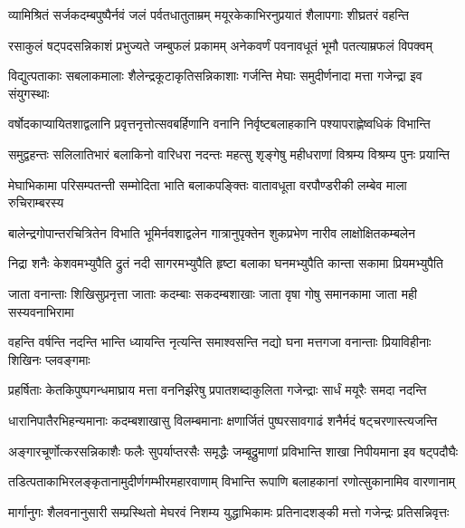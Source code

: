 \twolineshloka
{व्यामिश्रितं सर्जकदम्बपुष्पैर्नवं जलं पर्वतधातुताम्रम्}
{मयूरकेकाभिरनुप्रयातं शैलापगाः शीघ्रतरं वहन्ति} %

\twolineshloka
{रसाकुलं षट्पदसन्निकाशं प्रभुज्यते जम्बुफलं प्रकामम्}
{अनेकवर्णं पवनावधूतं भूमौ पतत्याम्रफलं विपक्वम्} %

\twolineshloka
{विद्युत्पताकाः सबलाकमालाः शैलेन्द्रकूटाकृतिसन्निकाशाः}
{गर्जन्ति मेघाः समुदीर्णनादा मत्ता गजेन्द्रा इव संयुगस्थाः} %

\twolineshloka
{वर्षोदकाप्यायितशाद्वलानि प्रवृत्तनृत्तोत्सवबर्हिणानि}
{वनानि निर्वृष्टबलाहकानि पश्यापराह्णेष्वधिकं विभान्ति} %

\twolineshloka
{समुद्वहन्तः सलिलातिभारं बलाकिनो वारिधरा नदन्तः}
{महत्सु शृङ्गेषु महीधराणां विश्रम्य विश्रम्य पुनः प्रयान्ति} %

\twolineshloka
{मेघाभिकामा परिसम्पतन्ती सम्मोदिता भाति बलाकपङ्क्तिः}
{वातावधूता वरपौण्डरीकी लम्बेव माला रुचिराम्बरस्य} %

\twolineshloka
{बालेन्द्रगोपान्तरचित्रितेन विभाति भूमिर्नवशाद्वलेन}
{गात्रानुपृक्तेन शुकप्रभेण नारीव लाक्षोक्षितकम्बलेन} %

\twolineshloka
{निद्रा शनैः केशवमभ्युपैति द्रुतं नदी सागरमभ्युपैति}
{हृष्टा बलाका घनमभ्युपैति कान्ता सकामा प्रियमभ्युपैति} %

\twolineshloka
{जाता वनान्ताः शिखिसुप्रनृत्ता जाताः कदम्बाः सकदम्बशाखाः}
{जाता वृषा गोषु समानकामा जाता मही सस्यवनाभिरामा} %

\twolineshloka
{वहन्ति वर्षन्ति नदन्ति भान्ति ध्यायन्ति नृत्यन्ति समाश्वसन्ति}
{नद्यो घना मत्तगजा वनान्ताः प्रियाविहीनाः शिखिनः प्लवङ्गमाः} %

\twolineshloka
{प्रहर्षिताः केतकिपुष्पगन्धमाघ्राय मत्ता वननिर्झरेषु}
{प्रपातशब्दाकुलिता गजेन्द्राः सार्धं मयूरैः समदा नदन्ति} %

\twolineshloka
{धारानिपातैरभिहन्यमानाः कदम्बशाखासु विलम्बमानाः}
{क्षणार्जितं पुष्परसावगाढं शनैर्मदं षट्चरणास्त्यजन्ति} %

\twolineshloka
{अङ्गारचूर्णोत्करसन्निकाशैः फलैः सुपर्याप्तरसैः समृद्धैः}
{जम्बूद्रुमाणां प्रविभान्ति शाखा निपीयमाना इव षट्पदौघैः} %

\twolineshloka
{तडित्पताकाभिरलङ्कृतानामुदीर्णगम्भीरमहारवाणाम्}
{विभान्ति रूपाणि बलाहकानां रणोत्सुकानामिव वारणानाम्} %

\twolineshloka
{मार्गानुगः शैलवनानुसारी सम्प्रस्थितो मेघरवं निशम्य}
{युद्धाभिकामः प्रतिनादशङ्की मत्तो गजेन्द्रः प्रतिसन्निवृत्तः} %


